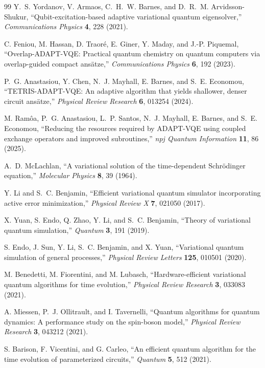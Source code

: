 \documentclass[
  reprint,
  amsmath,
  amssymb,
  aps,
  pra,
  nofootinbib,
  superscriptaddress,
  floatfix
]{revtex4-2}
\begin{document}
\begin{thebibliography}{99}
Y.~S. Yordanov, V. Armaos, C.~H.~W. Barnes, and D.~R.~M. Arvidsson-Shukur,
``Qubit-excitation-based adaptive variational quantum eigensolver,''
\emph{Communications Physics} \textbf{4}, 228 (2021).

C. Feniou, M. Hassan, D. Traor\'e, E. Giner, Y. Maday, and J.-P. Piquemal,
``Overlap-ADAPT-VQE: Practical quantum chemistry on quantum computers via overlap-guided compact ans\"atze,''
\emph{Communications Physics} \textbf{6}, 192 (2023).

P.~G. Anastasiou, Y. Chen, N.~J. Mayhall, E. Barnes, and S.~E. Economou,
``TETRIS-ADAPT-VQE: An adaptive algorithm that yields shallower, denser circuit ans\"atze,''
\emph{Physical Review Research} \textbf{6}, 013254 (2024).

M. Ram\^oa, P.~G. Anastasiou, L.~P. Santos, N.~J. Mayhall, E. Barnes, and S.~E. Economou,
``Reducing the resources required by ADAPT-VQE using coupled exchange operators and improved subroutines,''
\emph{npj Quantum Information} \textbf{11}, 86 (2025).

A.~D. McLachlan,
``A variational solution of the time-dependent Schr\"odinger equation,''
\emph{Molecular Physics} \textbf{8}, 39 (1964).

Y. Li and S.~C. Benjamin,
``Efficient variational quantum simulator incorporating active error minimization,''
\emph{Physical Review X} \textbf{7}, 021050 (2017).

X. Yuan, S. Endo, Q. Zhao, Y. Li, and S.~C. Benjamin,
``Theory of variational quantum simulation,''
\emph{Quantum} \textbf{3}, 191 (2019).

S. Endo, J. Sun, Y. Li, S.~C. Benjamin, and X. Yuan,
``Variational quantum simulation of general processes,''
\emph{Physical Review Letters} \textbf{125}, 010501 (2020).

M. Benedetti, M. Fiorentini, and M. Lubasch,
``Hardware-efficient variational quantum algorithms for time evolution,''
\emph{Physical Review Research} \textbf{3}, 033083 (2021).

A. Miessen, P.~J. Ollitrault, and I. Tavernelli,
``Quantum algorithms for quantum dynamics: A performance study on the spin-boson model,''
\emph{Physical Review Research} \textbf{3}, 043212 (2021).

S. Barison, F. Vicentini, and G. Carleo,
``An efficient quantum algorithm for the time evolution of parameterized circuits,''
\emph{Quantum} \textbf{5}, 512 (2021).


\end{thebibliography}
\end{document}
